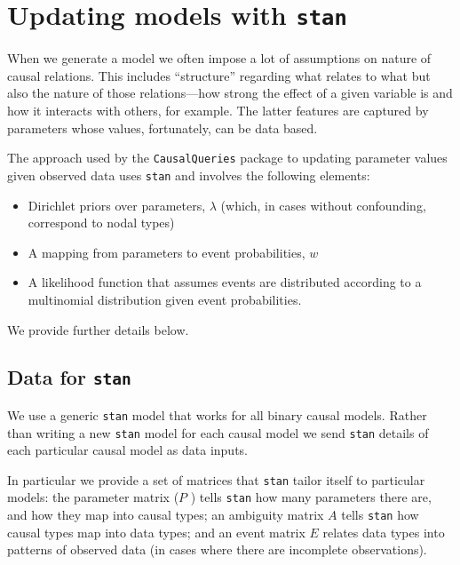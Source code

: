 \documentclass[
  12pt,
]{book}
\providecommand{\tightlist}{%
  \setlength{\itemsep}{0pt}\setlength{\parskip}{0pt}}
\begin{document}
\hypertarget{updating-models-with-stan}{%
\chapter{\texorpdfstring{Updating models with \texttt{stan}}{Updating models with stan}}\label{updating-models-with-stan}}

When we generate a model we often impose a lot of assumptions on nature of causal relations. This includes ``structure'' regarding what relates to what but also the nature of those relations---how strong the effect of a given variable is and how it interacts with others, for example. The latter features are captured by parameters whose values, fortunately, can be data based.

The approach used by the \texttt{CausalQueries} package to updating parameter values given observed data uses \texttt{stan} and involves the following elements:

\begin{itemize}
\tightlist
\item
  Dirichlet priors over parameters, \(\lambda\) (which, in cases without confounding, correspond to nodal types)
\item
  A mapping from parameters to event probabilities, \(w\)
\item
  A likelihood function that assumes events are distributed according to a multinomial distribution given event probabilities.
\end{itemize}

We provide further details below.

\hypertarget{data-for-stan}{%
\section{\texorpdfstring{Data for \texttt{stan}}{Data for stan}}\label{data-for-stan}}

We use a generic \texttt{stan} model that works for all binary causal models. Rather than writing a new \texttt{stan} model for each causal model we send \texttt{stan} details of each particular causal model as data inputs.

In particular we provide a set of matrices that \texttt{stan} tailor itself to particular models: the parameter matrix (\(P\) ) tells \texttt{stan} how many parameters there are, and how they map into causal types; an ambiguity matrix \(A\) tells \texttt{stan} how causal types map into data types; and an event matrix \(E\) relates data types into patterns of observed data (in cases where there are incomplete observations).
\end{document}

